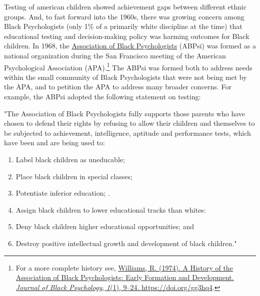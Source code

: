 \documentclass[
  oneside,
  12pt]{crumpbook}
\providecommand{\tightlist}{%
  \setlength{\itemsep}{0pt}\setlength{\parskip}{0pt}}
\begin{document}
Testing of american children showed achievement gaps between different ethnic groups. And, to fast forward into the 1960s, there was growing concern among Black Psychologists (only 1\% of a primarily white discipline at the time) that educational testing and decision-making policy was harming outcomes for Black children. In 1968, the \href{https://abpsi.org}{Association of Black Psychologists} (ABPsi) was formed as a national organization during the San Francisco meeting of the American Psychological Association (APA).\footnote{For a more complete history see, \protect\hyperlink{ref-williamsHistoryAssociationBlack1974}{Williams, R. (1974). A {History} of the {Association} of {Black Psychologists}: {Early Formation} and {Development}. \emph{Journal of Black Psychology}, \emph{1}(1), 9--24. \url{https://doi.org/gg3hq4}}.} The ABPsi was formed both to address needs within the small community of Black Psychologists that were not being met by the APA, and to petition the APA to address many broader concerns. For example, the ABPsi adopted the following statement on testing:

"The Association of Black Psychologists fully supports those parents who have chosen to defend their rights by refusing to allow their children and themselves to be subjected to achievement, intelligence, aptitude and performance tests, which have been and are being used to:

\begin{enumerate}
\def\labelenumi{\arabic{enumi}.}
\tightlist
\item
  Label black children as uneducable;
\item
  Place black children in special classes;
\item
  Potentiate inferior education; .
\item
  Assign black children to lower educational tracks than whites:
\item
  Deny black children higher educational opportunities; and
\item
  Destroy positive intellectual growth and development of black children."
\end{enumerate}
\end{document}

